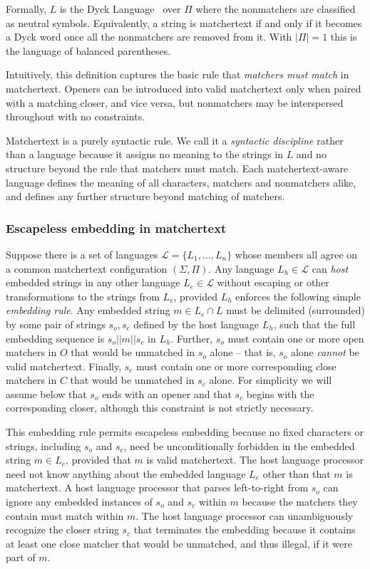 Formally, $L$ is the Dyck Language~\cite{chomsky63algebraic} over $\Pi$ where the nonmatchers are classified
as neutral symbols. Equivalently, a string is matchertext if and only if it becomes a Dyck word once all the
nonmatchers are removed from it.
With $|\Pi| = 1$ this is the language of balanced parentheses.

Intuitively, this definition captures the basic rule
that \emph{matchers must match} in matchertext.
Openers can be introduced into valid matchertext
only when paired with a matching closer, and vice versa,
but nonmatchers may be interspersed throughout with no constraints.

Matchertext is a purely syntactic rule.
We call it a \emph{syntactic discipline} rather than a language
because it assigns no meaning to the strings in $L$
and no structure beyond the rule that matchers must match.
Each matchertext-aware language defines
the meaning of all characters, matchers and nonmatchers alike,
and defines any further structure beyond matching of matchers.

\subsubsection{Escapeless embedding in matchertext}
\label{sec:design:abstract:embed}

Suppose there is a set of languages $\mathcal{L} = \{L_1,\dots,L_n\}$
whose members all agree on a common  matchertext configuration $(\Sigma,\Pi)$.
Any language $L_h \in \mathcal{L}$ can \emph{host}
embedded strings in any other language $L_e \in \mathcal{L}$
without escaping or other transformations to the strings from $L_e$,
provided $L_h$ enforces the following simple \emph{embedding rule}.
Any embedded string $m \in L_e \cap L$
must be delimited (surrounded) by
some pair of strings $s_o, s_c$ defined by the host language $L_h$,
such that the full embedding sequence is $s_o || m || s_c$ in $L_h$.
Further, $s_o$ must contain one or more open matchers in $O$
that would be unmatched in $s_o$ alone --
that is, $s_o$ alone \emph{cannot} be valid matchertext.
Finally, $s_c$ must contain one or more corresponding close matchers in $C$
that would be unmatched in $s_c$ alone.
For simplicity we will assume below that $s_o$ ends with an opener
and that $s_c$ begins with the corresponding closer,
although this constraint is not strictly necessary.

This embedding rule permits escapeless embedding
because no fixed characters or strings, including $s_o$ and $s_c$,
need be unconditionally forbidden in the embedded string $m \in L_e$,
provided that $m$ is valid matchertext.
The host language processor need not know anything
about the embedded language $L_e$ other than that $m$ is matchertext.
A host language processor that parses left-to-right from $s_o$
can ignore any embedded instances of $s_o$ and $s_c$ within $m$
because the matchers they contain must match within $m$.
The host language processor can unambiguously recognize
the closer string $s_c$ that terminates the embedding
because it contains at least one close matcher
that would be unmatched, and thus illegal, if it were part of $m$.

